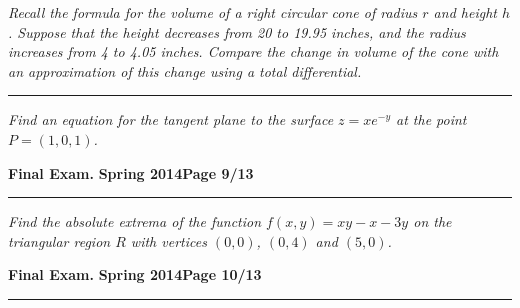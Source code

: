 \documentclass[12pt]{article}
\begin{document}
\bigskip
{\problem[15 pts] \em Recall the formula for the volume of a right circular cone of radius $r$ and height $h$.  Suppose that the height decreases from 20 to 19.95 inches, and the radius increases from 4 to 4.05 inches.  Compare the change in volume of the cone with an approximation of this change using a total differential.}
\vspace{9cm}
\begin{flushright}
\end{flushright}
\hrule
{\problem[10 pts] \em Find an equation for the tangent plane to the surface $z=xe^{-y}$ at the point $P=(1,0,1)$.}
\vspace{4cm}
\begin{flushright}
\end{flushright}
\newpage

\hfill{\large\bf Final Exam.}\hfill{\large\bf
  Spring 2014}\hfill{\large\bf Page 9/13}\hrule

\bigskip
{\problem[20 pts] \em Find the absolute extrema of the function $f(x,y) = xy-x-3y$ on the triangular region $R$ with vertices $(0,0)$, $(0,4)$ and $(5,0)$.}
\vspace{18.5cm}
\begin{flushright}
\end{flushright}
\newpage


\hfill{\large\bf Final Exam.}\hfill{\large\bf
  Spring 2014}\hfill{\large\bf Page 10/13}\hrule
\end{document}
